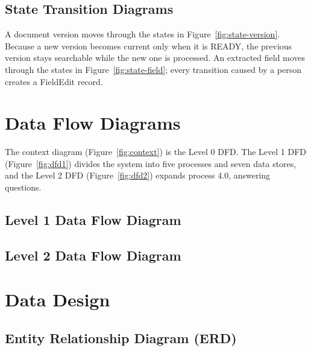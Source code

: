 
\subsection{State Transition Diagrams}
A document version moves through the states in Figure~\ref{fig:state-version}. Because a new version
becomes current only when it is READY, the previous version stays searchable while the new one is
processed. An extracted field moves through the states in Figure~\ref{fig:state-field}; every
transition caused by a person creates a FieldEdit record.


\section{Data Flow Diagrams}
The context diagram (Figure~\ref{fig:context}) is the Level 0 DFD. The Level 1 DFD
(Figure~\ref{fig:dfd1}) divides the system into five processes and seven data stores, and the Level 2
DFD (Figure~\ref{fig:dfd2}) expands process 4.0, answering questions.

\subsection{Level 1 Data Flow Diagram}

\subsection{Level 2 Data Flow Diagram}

\section{Data Design}
\subsection{Entity Relationship Diagram (ERD)}

